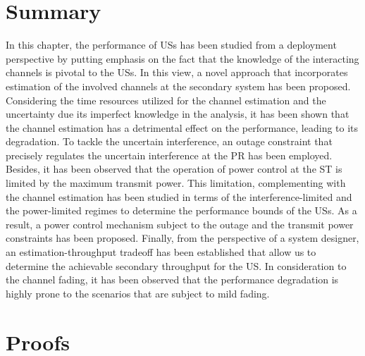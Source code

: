 \section{Summary} \label{sec:conc}
In this chapter, the performance of USs has been studied from a deployment perspective by putting emphasis on the fact that the knowledge of the interacting channels is pivotal to the USs. In this view, a novel approach that incorporates estimation of the involved channels at the secondary system has been proposed. Considering the time resources utilized for the channel estimation and the uncertainty due its imperfect knowledge in the analysis, it has been shown that the channel estimation has a detrimental effect on the performance, leading to its degradation. To tackle the uncertain interference, an outage constraint that precisely regulates the uncertain interference at the PR has been employed. Besides, it has been observed that the operation of power control at the ST is limited by the maximum transmit power. This limitation, complementing with the channel estimation has been studied in terms of the interference-limited and the power-limited regimes to determine the performance bounds of the USs. As a result, a power control mechanism subject to the outage and the transmit power constraints has been proposed. Finally, from the perspective of a system designer, an estimation-throughput tradeoff has been established that allow us to determine the achievable secondary throughput for the US. In consideration to the channel fading, it has been observed that the performance degradation is highly prone to the scenarios that are subject to mild fading. 

\section{Proofs}
